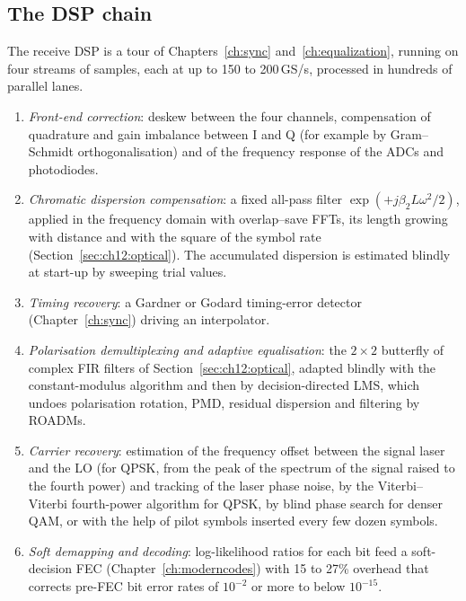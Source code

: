 \subsection{The DSP chain}

The receive DSP is a tour of Chapters~\ref{ch:sync} and~\ref{ch:equalization}, running on four streams of
samples, each at up to 150 to 200\,GS/s, processed in hundreds of parallel lanes.

\begin{enumerate}
\item \emph{Front-end correction}: deskew between the four channels, compensation of quadrature and gain
imbalance between I and Q (for example by Gram--Schmidt orthogonalisation) and of the frequency response of
the ADCs and photodiodes.
\item \emph{Chromatic dispersion compensation}: a fixed all-pass filter $\exp(+j\beta_2L\omega^2/2)$, applied in
the frequency domain with overlap--save FFTs, its length growing with distance and with the square of the
symbol rate (Section~\ref{sec:ch12:optical}). The accumulated dispersion is estimated blindly at start-up
by sweeping trial values.
\item \emph{Timing recovery}: a Gardner or Godard timing-error detector (Chapter~\ref{ch:sync}) driving an
interpolator.
\item \emph{Polarisation demultiplexing and adaptive equalisation}: the $2\times2$ butterfly of complex FIR
filters of Section~\ref{sec:ch12:optical}, adapted blindly with the constant-modulus algorithm and then by
decision-directed LMS, which undoes polarisation rotation, PMD, residual dispersion and filtering by ROADMs.
\item \emph{Carrier recovery}: estimation of the frequency offset between the signal laser and the LO (for
QPSK, from the peak of the spectrum of the signal raised to the fourth power) and tracking of the laser
phase noise, by the Viterbi--Viterbi fourth-power algorithm for QPSK, by blind phase search for denser
QAM, or with the help of pilot symbols inserted every few dozen symbols.
\item \emph{Soft demapping and decoding}: log-likelihood ratios for each bit feed a soft-decision FEC
(Chapter~\ref{ch:moderncodes}) with 15 to 27\% overhead that corrects pre-FEC bit error rates of
$10^{-2}$ or more to below $10^{-15}$.
\end{enumerate}



